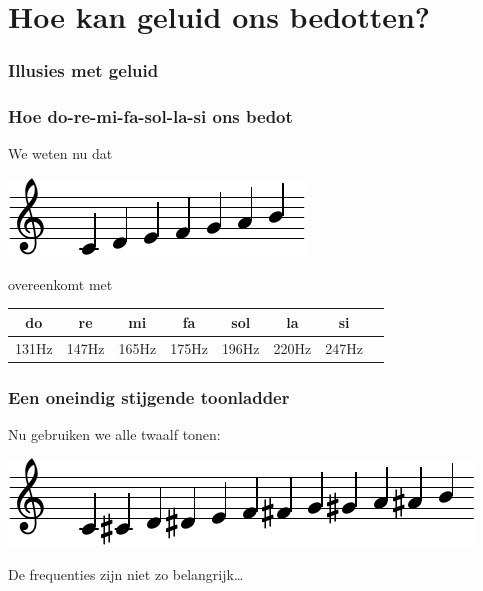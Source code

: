 \documentclass[compress, darktitle, framenumber, totalframenumber]{beamer}
\begin{document}
\section{Hoe kan geluid ons bedotten?}
\begin{frame}
  \frametitle{Illusies met geluid}

  \centering
\end{frame}

\begin{frame}
  \frametitle{Hoe do-re-mi-fa-sol-la-si ons bedot}

  We weten nu dat
  \begin{center}
    \includegraphics{scores/scale-cropped}
  \end{center}
  overeenkomt met
  \begin{center}
    \begin{tabular}[h]{cccccccc}
      do & re & mi & fa & sol & la & si \\\midrule
      131Hz & 147Hz & 165Hz & 175Hz & 196Hz & 220Hz & 247Hz
    \end{tabular}
  \end{center}
\end{frame}

\begin{frame}
  \frametitle{Een oneindig stijgende toonladder}

  Nu gebruiken we alle twaalf tonen:
  \begin{center}
    \includegraphics{scores/scale-full-cropped}
  \end{center}
  De frequenties zijn niet zo belangrijk\ldots
\end{frame}
\end{document}
